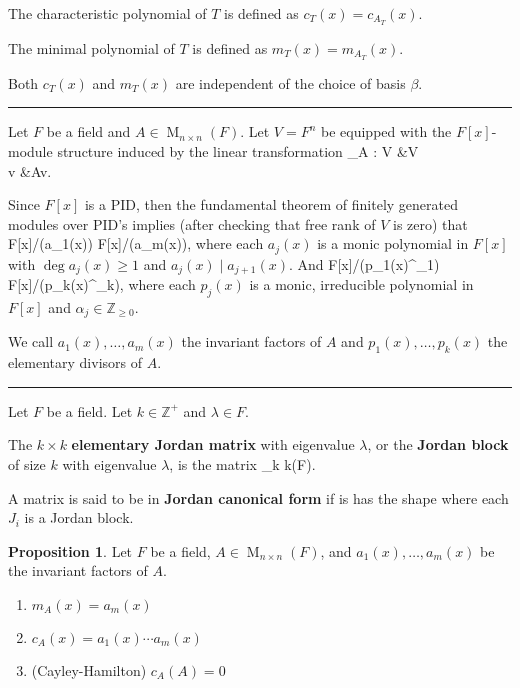 \documentclass[12pt]{article}
\newcommand{\keyword}[1]{\textbf{#1}}
\def\[#1\]{\begin{align*}#1\end{align*}}
\newcommand{\sepline}{\rule{\textwidth}{0.4pt}}
\theoremstyle{definition}
\newtheorem{proposition}{Proposition}
\newcommand{\Z}{\mathbb{Z}}
\newcommand{\<}{\left\langle}
\renewcommand{\>}{\right\rangle}
\newcommand{\isom}{\cong}
\newcommand{\dsum}{\oplus}
\newcommand{\divides}{\mid}
\newcommand{\sqMat}[1]{\operatorname{M}_{#1 \times #1}}
\newcommand{\MnF}{\sqMat{n}(F)}
\begin{document}
The characteristic polynomial of $T$ is defined as $c_T(x) = c_{A_T}(x)$.

The minimal polynomial of $T$ is defined as $m_T(x) = m_{A_T}(x)$.

Both $c_T(x)$ and $m_T(x)$ are independent of the choice of basis $\beta$.

\sepline

Let $F$ be a field and $A \in \MnF$. Let $V = F^n$ be equipped with the $F[x]$-module structure induced by the linear transformation
\[
    T_A : V &\to V \\
    v &\mapsto Av.
\]

Since $F[x]$ is a PID, then the fundamental theorem of finitely generated modules over PID's implies (after checking that free rank of $V$ is zero) that
\[
    V \isom F[x]/(a_1(x)) \dsum \cdots \dsum F[x]/(a_m(x)),
\]
where each $a_j(x)$ is a monic polynomial in $F[x]$ with $\deg a_j(x) \geq 1$ and $a_j(x) \divides a_{j+1}(x)$. And
\[
    V \isom F[x]/(p_1(x)^{\alpha_1}) \dsum \cdots \dsum F[x]/(p_k(x)^{\alpha_k}),
\]
where each $p_j(x)$ is a monic, irreducible polynomial in $F[x]$ and $\alpha_j \in \Z_{\geq 0}$.

We call $a_1(x), \dots, a_m(x)$ the invariant factors of $A$ and $p_1(x), \dots, p_k(x)$ the elementary divisors of $A$.

\sepline

Let $F$ be a field. Let $k \in \Z^+$ and $\lambda \in F$.

The $k \times k$ \keyword{elementary Jordan matrix} with eigenvalue $\lambda$, or the \keyword{Jordan block} of size $k$ with eigenvalue $\lambda$, is the matrix
\[
    \mqty[
        \lambda & 1 & & 0 \\
        & \lambda & \ddots  \\
        && \ddots & 1 \\
        0&&& \lambda 
    ]
    \in \sqMat{k}(F).
\]

A matrix is said to be in \keyword{Jordan canonical form} if is has the shape
\[
    \mqty[\dmat{J_1, J_2, \ddots, J_t}]
\]
where each $J_i$ is a Jordan block.



\newpage

\begin{proposition}
    Let $F$ be a field, $A \in \MnF$, and $a_1(x), \dots, a_m(x)$ be the invariant factors of $A$.
    \begin{enumerate}[(1)]
        \item $m_A(x) = a_m(x)$
        \item $c_A(x) = a_1(x) \cdots a_m(x)$
        \item (Cayley-Hamilton) $c_A(A) = 0$
    \end{enumerate}
\end{proposition}
\end{document}
